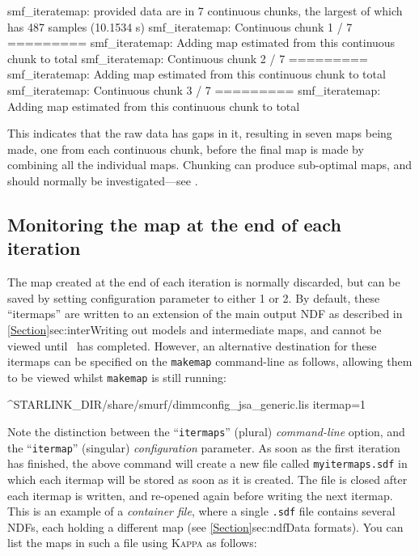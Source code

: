\begin{terminalv}
\begin{terminalv}
smf_iteratemap: provided data are in 7 continuous chunks, the largest of
which has 487 samples (10.1534 s)
smf_iteratemap: Continuous chunk 1 / 7 =========
smf_iteratemap: Adding map estimated from this continuous chunk to total
smf_iteratemap: Continuous chunk 2 / 7 =========
smf_iteratemap: Adding map estimated from this continuous chunk to total
smf_iteratemap: Continuous chunk 3 / 7 =========
smf_iteratemap: Adding map estimated from this continuous chunk to total
\end{terminalv}

This indicates that the raw data has gaps in it, resulting in seven maps
being made, one from each continuous chunk, before the final map is made
by combining all the individual maps. Chunking can produce sub-optimal
maps, and should normally be investigated---see .

\subsection{Monitoring the map at the end of each iteration}
\label{sec:itermaps}
The map created at the end of each iteration is normally discarded, but can
be saved by setting configuration parameter 
to either 1 or 2. By default, these ``itermaps'' are written to an
extension of the main output NDF as described in
\cref{Section}{sec:inter}{Writing out models and intermediate maps}, and
cannot be viewed until \makemap\ has completed. However, an alternative
destination for these itermaps can be specified on the \texttt{makemap}
command-line as follows, allowing them to be viewed whilst \texttt{makemap}
is still running:

\begin{terminalv}
^STARLINK_DIR/share/smurf/dimmconfig_jsa_generic.lis
itermap=1
%
\end{terminalv}

Note the distinction between the ``\texttt{itermaps}'' (plural)
\emph{command-line} option, and the ``\texttt{itermap}'' (singular)
\emph{configuration} parameter.  As soon as the first iteration has
finished, the above command will create a new file
called \texttt{myitermaps.sdf} in which each itermap will be stored as soon
as it is created. The file is closed after each itermap is written, and
re-opened again before writing the next itermap. This is an example of a
\emph{container file}, where a single \texttt{.sdf} file contains several
NDFs, each holding a different map (see \cref{Section}{sec:ndf}{Data
formats}). You can list the maps in such a file using \textsc{Kappa}
 as follows:


\end{terminalv}
